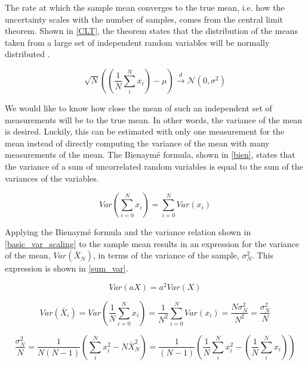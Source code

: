 The rate at which the sample mean converges to the true mean, i.e. how the uncertainty scales with the number of samples, comes from the central limit theorem.  Shown in \eqref{CLT}, the theorem states that the distribution of the means taken from a large set of independent random variables will be normally distributed \cite{openmc}.  

\begin{equation}
\label{CLT}
\sqrt{N}\left(\left(\frac{1}{N} \sum_i^N x_i \right)-\mu\right) \xrightarrow[]	{d} \mathcal{N}(0,\sigma^2)
\end{equation}

We would like to know how close the mean of such an independent set of measurements will be to the true mean.  In other words, the variance of the mean is desired.  Luckily, this can be estimated with only one measurement for the mean instead of directly computing the variance of the mean with many measurements of the mean.  The Bienaym\'e formula, shown in \eqref{bien}, states that the variance of a sum of uncorrelated random variables is equal to the sum of the variances of the variables.

\begin{equation}
\label{bien}
Var\left(\sum_{i=0}^N x_i \right) = \sum_{i=0}^N Var(x_i)
\end{equation}      

Applying the Bienaym\'e formula and the variance relation shown in \eqref{basic_var_scaling} to the sample mean results in an expression for the variance of the mean, $Var(\bar{X}_N)$, in terms of the variance of the sample, $\sigma_N^2$.  This expression is shown in \eqref{sum_var}.  

\begin{equation}
\label{basic_var_scaling}
Var\left(a X \right) = a^2 Var\left( X \right)
\end{equation}

\begin{equation}
\label{sum_var_1}
Var(\bar{X}_i) = Var\left(\frac{1}{N}\sum_{i=0}^N x_i \right) = \frac{1}{N^2} \sum_{i=0}^N Var(x_i) = \frac{N\sigma_N^2}{N^2} =  \frac{\sigma_N^2}{N} 
\end{equation}

\begin{equation}
\label{sum_var}
 \frac{\sigma_N^2}{N} = \frac{1}{N(N-1)} \left( \sum_i^N x_i^2- N\bar{X}_N^2 \right) = \frac{1}{(N-1)} \left( \frac{1}{N} \sum_i^N x_i^2 - \left(   \frac{1}{N} \sum_i^N x_i \right)   \right)
\end{equation}

